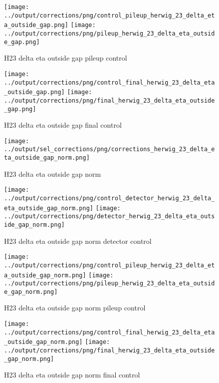 \documentclass[11pt]{book}
\begin{document}
\begin{figure}[ht]
\centering
\texttt{[image: ../output/corrections/png/control\_pileup\_herwig\_23\_delta\_eta\_outside\_gap.png]}
\texttt{[image: ../output/corrections/png/pileup\_herwig\_23\_delta\_eta\_outside\_gap.png]}
\caption{H23 delta eta outside gap pileup control}
\label{fig:H23_delta_eta_outside_gap_pileup_control}
\end{figure}


\begin{figure}[ht]
\centering
\texttt{[image: ../output/corrections/png/control\_final\_herwig\_23\_delta\_eta\_outside\_gap.png]}
\texttt{[image: ../output/corrections/png/final\_herwig\_23\_delta\_eta\_outside\_gap.png]}
\caption{H23 delta eta outside gap final control}
\label{fig:H23_delta_etat_outside_gap_final_control}
\end{figure}


\begin{figure}[ht]
\centering
\texttt{[image: ../output/sel\_corrections/png/corrections\_herwig\_23\_delta\_eta\_outside\_gap\_norm.png]}
\caption{H23 delta eta outside gap norm}
\label{fig:H23_delta_eta_outside_gap_norm}
\end{figure}


\begin{figure}[ht]
\centering
\texttt{[image: ../output/corrections/png/control\_detector\_herwig\_23\_delta\_eta\_outside\_gap\_norm.png]}
\texttt{[image: ../output/corrections/png/detector\_herwig\_23\_delta\_eta\_outside\_gap\_norm.png]}
\caption{H23 delta eta outside gap norm detector control}
\label{fig:H23_delta_eta_outside_gap_norm_detector_control}
\end{figure}

\begin{figure}[ht]
\centering
\texttt{[image: ../output/corrections/png/control\_pileup\_herwig\_23\_delta\_eta\_outside\_gap\_norm.png]}
\texttt{[image: ../output/corrections/png/pileup\_herwig\_23\_delta\_eta\_outside\_gap\_norm.png]}
\caption{H23 delta eta outside gap norm pileup control}
\label{fig:H23_delta_eta_outside_gap_norm_pileup_control}
\end{figure}


\begin{figure}[ht]
\centering
\texttt{[image: ../output/corrections/png/control\_final\_herwig\_23\_delta\_eta\_outside\_gap\_norm.png]}
\texttt{[image: ../output/corrections/png/final\_herwig\_23\_delta\_eta\_outside\_gap\_norm.png]}
\caption{H23 delta eta outside gap norm final control}
\label{fig:H23_delta_etat_outside_gap_norm_final_control}
\end{figure}
\end{document}
